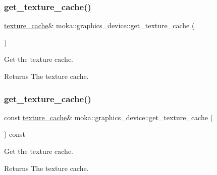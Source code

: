 \subsubsection{\texorpdfstring{get\_texture\_cache()}{get\_texture\_cache()}\hspace{0.1cm}{\footnotesize\ttfamily [1/2]}}
{\footnotesize\ttfamily \mbox{\hyperlink{classmoka_1_1texture__cache}{texture\+\_\+cache}}\& moka\+::graphics\+\_\+device\+::get\+\_\+texture\+\_\+cache (\begin{DoxyParamCaption}{ }\end{DoxyParamCaption})}



Get the texture cache. 

\begin{DoxyReturn}{Returns}
The texture cache. 
\end{DoxyReturn}
\mbox{\label{classmoka_1_1graphics__device_adb460df9566b5f03d95cbe10ada931cf}} 
\subsubsection{\texorpdfstring{get\_texture\_cache()}{get\_texture\_cache()}\hspace{0.1cm}{\footnotesize\ttfamily [2/2]}}
{\footnotesize\ttfamily const \mbox{\hyperlink{classmoka_1_1texture__cache}{texture\+\_\+cache}}\& moka\+::graphics\+\_\+device\+::get\+\_\+texture\+\_\+cache (\begin{DoxyParamCaption}{ }\end{DoxyParamCaption}) const}



Get the texture cache. 

\begin{DoxyReturn}{Returns}
The texture cache. 
\end{DoxyReturn}
\mbox{\label{classmoka_1_1graphics__device_ac00cc461a5283777edfe6e49f7948de0}} 
